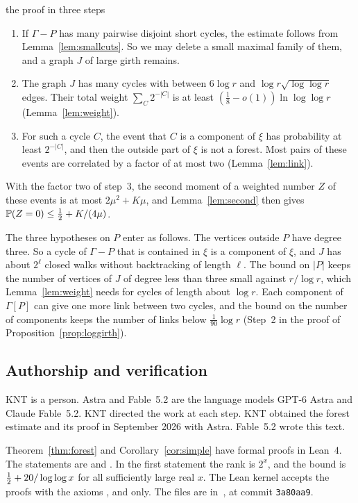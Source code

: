 \documentclass[11pt]{article}
\begin{document}
\begin{idea}{the proof in three steps}
\begin{enumerate}[leftmargin=1.5em]
\item If $\Gamma-P$ has many pairwise disjoint short cycles, the estimate follows from
Lemma~\ref{lem:smallcuts}. So we may delete a small maximal family of them, and a graph $J$ of
large girth remains.
\item The graph $J$ has many cycles with between $6\log r$ and $\log r\sqrt{\log\log r}$ edges.
Their total weight $\sum_C2^{-|C|}$ is at least $(\frac18-o(1))\ln\log\log r$
(Lemma~\ref{lem:weight}).
\item For such a cycle $C$, the event that $C$ is a component of $\xi$ has probability at least
$2^{-|C|}$, and then the outside part of $\xi$ is not a forest. Most pairs of these events are
correlated by a factor of at most two (Lemma~\ref{lem:link}).
\end{enumerate}
With the factor two of step~3, the second moment of a weighted number $Z$ of these events is at
most $2\mu^{2}+K\mu$, and Lemma~\ref{lem:second} then gives $\mathbb{P}(Z=0)\le\tfrac12+K/(4\mu)$.
\end{idea}

The three hypotheses on $P$ enter as follows. The vertices outside $P$ have degree three. So a
cycle of $\Gamma-P$ that is contained in $\xi$ is a component of $\xi$, and $J$ has about
$2^{\ell}$ closed walks without backtracking of length $\ell$. The bound on $|P|$ keeps the
number of vertices of $J$ of degree less than three small against $r/\log r$, which
Lemma~\ref{lem:weight} needs for cycles of length about $\log r$. Each component of $\Gamma[P]$
can give one more link between two cycles, and the bound on the number of components keeps the
number of links below $\frac1{90}\log r$ (Step~2 in the proof of
Proposition~\ref{prop:loggirth}).

\subsection{Authorship and verification}\label{sec:status}

KNT is a person. Astra and Fable~5.2 are the language models GPT-6 Astra and Claude Fable~5.2.
KNT directed the work at each step. KNT obtained the forest estimate and its proof in September
2026 with Astra. Fable~5.2 wrote this text.

Theorem~\ref{thm:forest} and Corollary~\ref{cor:simple} have formal proofs in Lean~4. The
statements are  and
. In the first statement the
rank is $2^{x}$, and the bound is $\tfrac12+20/\log\log x$ for all sufficiently large real $x$.
The Lean kernel accepts the proofs with the axioms ,  and
 only. The files are in~\cite{Repo}, at commit \texttt{3a80aa9}.
\end{document}
